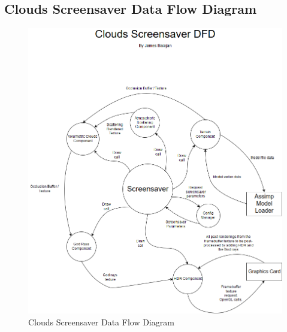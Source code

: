\documentclass[10pt, openany]{book}
\begin{document}
\subsection{Clouds Screensaver Data Flow Diagram}
\begin{figure}[H]
	\centering
	\includegraphics[width=1.0\linewidth]{Clouds Screensaver DFD}
	\caption{Clouds Screensaver Data Flow Diagram}
	\label{app:clouds-dfd}
\end{figure}
\newpage
\end{document}
